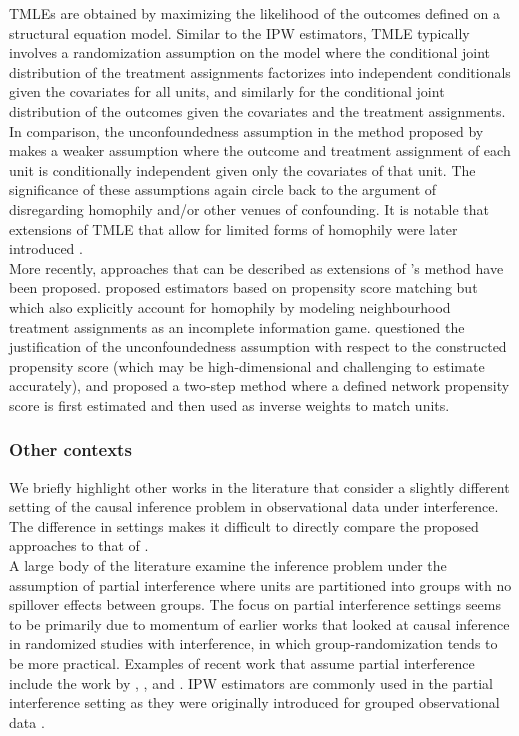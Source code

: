 \documentclass[10pt]{article}
\begin{document}
TMLEs are obtained by maximizing the likelihood of the outcomes defined on a structural equation model. Similar to the IPW estimators, TMLE typically involves a randomization assumption \parencite{VanDerLaan:2014} on the model where the conditional joint distribution of the treatment assignments factorizes into independent conditionals given the covariates for all units, and similarly for the conditional joint distribution of the outcomes given the covariates and the treatment assignments. In comparison, the unconfoundedness assumption in the method proposed by \textcite{Forastiere:2021} makes a weaker assumption where the outcome and treatment assignment of each unit is conditionally independent given only the covariates of that unit. The significance of these assumptions again circle back to the argument of disregarding homophily and/or other venues of confounding. It is notable that extensions of TMLE that allow for limited forms of homophily were later introduced \parencite{Ogburn:2017}.
\\

More recently, approaches that can be described as extensions of \textcite{Forastiere:2021}'s method have been proposed. \textcite{Jackson:2020} proposed estimators based on propensity score matching but which also explicitly account for homophily by modeling neighbourhood treatment assignments as an incomplete information game. \textcite{Sanchez:2021} questioned the justification of the unconfoundedness assumption with respect to the constructed propensity score (which may be high-dimensional and challenging to estimate accurately), and proposed a two-step method where a defined network propensity score is first estimated and then used as inverse weights to match units.

\subsubsection{Other contexts}

We briefly highlight other works in the literature that consider a slightly different setting of the causal inference problem in observational data under interference. The difference in settings makes it difficult to directly compare the proposed approaches to that of \textcite{Forastiere:2021}.
\\

A large body of the literature examine the inference problem under the assumption of partial interference where units are partitioned into groups with no spillover effects between groups. The focus on partial interference settings seems to be primarily due to momentum of earlier works \parencite[e.g.,][]{Sobel:2006,Hudgens:2008} that looked at causal inference in randomized studies with interference, in which group-randomization tends to be more practical. Examples of recent work that assume partial interference include the work by \textcite{Liu:2019}, \textcite{Barkley:2020}, and \textcite{Qu:2021}. IPW estimators are commonly used in the partial interference setting as they were originally introduced for grouped observational data \parencite{Tchetgen:2012}.
\\
\end{document}
